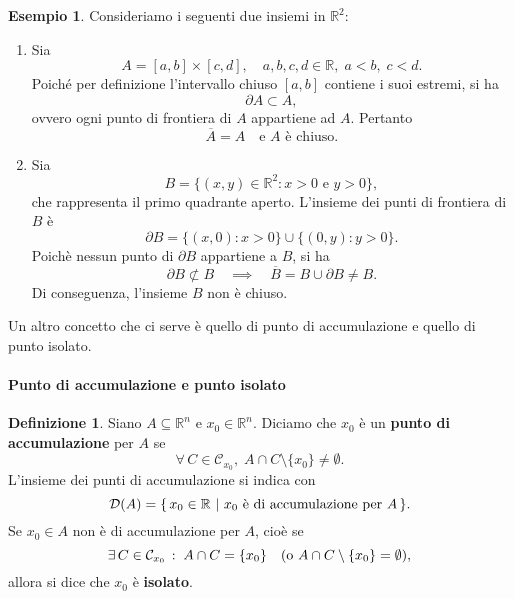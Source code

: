 \documentclass{article}
\theoremstyle{plain}
\theoremstyle{definition}
\newtheorem{defn}{Definizione}[section]
\newtheorem{exmp}{Esempio}[section]
\theoremstyle{remark}
\newcommand{\incfig}[2][\columnwidth]{%
    \def\svgwidth{#1}
    {#2.pdf_tex}
}
\begin{document}
\begin{exmp}
Consideriamo i seguenti due insiemi in $\mathbb{R}^2$:
\begin{enumerate}
    \item Sia 
    \[
    A = [a,b] \times [c,d], \quad a,b,c,d\in\mathbb{R},\; a<b,\; c<d.
    \]
    Poiché per definizione l'intervallo chiuso $[a,b]$ contiene i suoi estremi, si ha
    \[
    \partial A \subset A,
    \]
    ovvero ogni punto di frontiera di $A$ appartiene ad $A$. Pertanto
    \[
    \overline{A} = A \quad \text{e } A \text{ è chiuso.}
    \]

    \item Sia
    \[
    B = \{(x,y)\in\mathbb{R}^2 : x>0 \text{ e } y>0\},
    \]
    che rappresenta il primo quadrante aperto. L'insieme dei punti di frontiera di $B$ è
    \[
    \partial B = \{(x,0) : x>0\}\cup\{(0,y) : y>0\}.
    \]
    Poichè nessun punto di $\partial B$ appartiene a $B$, si ha
    \[
    \partial B \not\subset B \quad \implies \quad \overline{B} = B\cup \partial B \neq B.
    \]
    Di conseguenza, l'insieme $B$ non è chiuso.
\end{enumerate}
\end{exmp}

\vspace{10pt}

Un altro concetto che ci serve è quello di punto di accumulazione e quello di punto isolato. 

\vspace{10pt}

\paragraph{Punto di accumulazione e punto isolato}
\begin{bxthm}
\begin{defn}
    Siano $A\subseteq\mathbb{R}^n$ e $x_0\in\mathbb{R}^n$. Diciamo che $x_0$ è un \textbf{punto di accumulazione} per $A$ se \[\forall\,C\in\mathcal{C}_{x_0},\;A\cap C\setminus\{x_0\}\neq\emptyset.\]
    L'insieme dei punti di accumulazione si indica con \[\mathcal{D}(A)=\{\,x_0\in\mathbb{R} \ | \ x_0 \textup{ è di accumulazione per }A\,\}.\]
    Se $x_0\in A$ non è di accumulazione per $A$, cioè se 
    \[\exists\,C\in\mathcal{C}_{x_0}\,:\;A\cap C=\{x_0\} \quad (\textup{o }A\cap C\setminus\{x_0\}=\emptyset), \]
    allora si dice che $x_0$ è \textbf{isolato}.
\end{defn}
\end{bxthm}
\end{document}
